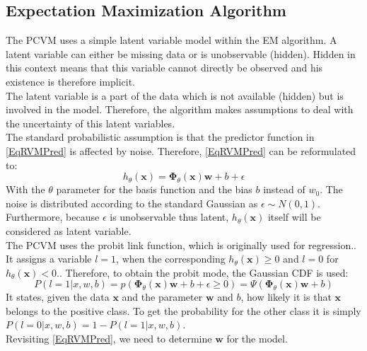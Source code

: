 \subsection{Expectation Maximization Algorithm}\label{PcSecEM}
The \acs{PCVM} uses a simple latent variable model within the \acs{EM} algorithm.\cite{Chen.2009}
A latent variable can either be missing data or is unobservable (hidden).\cite[p. 276-277]{TrevorHastie.2009}\cite[p. 84]{Bishop.2009}
Hidden in this context means that this variable cannot directly be observed and his existence is therefore implicit.\cite{Borsboom.}\\
The latent variable is a part of the data which is not available (hidden) but is involved in the model.
Therefore, the algorithm makes assumptions to deal with the uncertainty of this latent variables.\\
The standard probabilistic assumption is that the predictor function in \eqref{EqRVMPred} is affected by noise.
Therefore, \eqref{EqRVMPred} can be reformulated to:\cite{Chen.2009}
\begin{equation}\label{EqPcvmRessNoise}
h_\theta (\mathbf{x}) = \boldsymbol{\Phi}_\theta(\mathbf{x}) \mathbf{w} + b +  \epsilon
\end{equation} 
With the $\theta$ parameter for the basis function and the bias $b$ instead of $w_0$.
The noise is distributed according to the standard Gaussian as $\epsilon \sim N(0,1)$.
Furthermore, because $\epsilon$ is unobservable thus latent, $h_\theta(\mathbf{x})$ itself will be considered as latent variable.\cite{Chen.2009}\\
The \acs{PCVM} uses the probit link function, which is originally used for regression.\cite{Albert.1993}. It assigns a variable $l = 1$, when the corresponding $h_\theta (\mathbf{x}) \ge 0$ and $l = 0$ for $h_\theta (\mathbf{x}) < 0$.\cite{Chen.2009}.
Therefore, to obtain the probit mode, the Gaussian \acs{CDF} is used:
\begin{equation}\label{EqProbitLinkProb}
P(l=1\vert x,w,b) = p(\boldsymbol{\Phi}_\theta(\mathbf{x})\mathbf{w} + b + \epsilon \ge 0) = \Psi(\boldsymbol{\Phi}_\theta(\mathbf{x})\mathbf{w} +b)
\end{equation}
It states, given the data $\mathbf{x}$ and the parameter $\mathbf{w}$ and $b$, how likely it is that $\mathbf{x}$ belongs to the positive class.
To get the probability for the other class it is simply $P(l=0 \vert x,w,b) = 1-P(l=1\vert x,w,b)$.\cite{Chen.2009}\\
Revisiting \eqref{EqRVMPred}, we need to determine $\mathbf{w}$ for the model.
